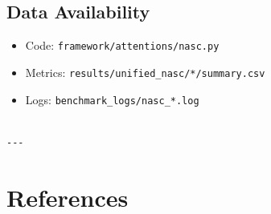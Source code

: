 \subsection{Data Availability}

\begin{itemize}
\item Code: \texttt{framework/attentions/nasc.py}
\item Metrics: \texttt{results/unified\_nasc/*/summary.csv}
\item Logs: \texttt{benchmark\_logs/nasc\_*.log}
\end{itemize}
\begin{lstlisting}

---
\end{lstlisting}


\section{References}

